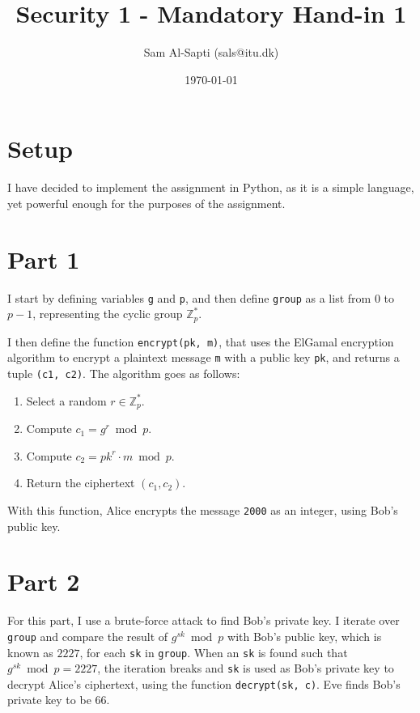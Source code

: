 \documentclass[12pt,a4paper]{article}
\title{Security 1 - Mandatory Hand-in 1}
\date{\today}
\author{Sam Al-Sapti (sals@itu.dk)}
\begin{document}
    \maketitle

    \section*{Setup}

    I have decided to implement the assignment in Python, as it is a simple
    language, yet powerful enough for the purposes of the assignment.
    
    \section*{Part 1}

    I start by defining variables \texttt{g} and \texttt{p}, and then define
    \texttt{group} as a list from $0$ to $p - 1$, representing the cyclic
    group $\mathbb{Z}^*_p$.

    I then define the function \texttt{encrypt(pk, m)}, that uses the ElGamal
    encryption algorithm to encrypt a plaintext message \texttt{m} with a
    public key \texttt{pk}, and returns a tuple \texttt{(c1, c2)}. The
    algorithm goes as follows:

    \begin{enumerate}
        \item Select a random $r \in \mathbb{Z}^*_p$.
        \item Compute $c_1 = g^r \bmod p$.
        \item Compute $c_2 = {pk}^r \cdot m \bmod p$.
        \item Return the ciphertext $(c_1, c_2)$.
    \end{enumerate}

    With this function, Alice encrypts the message \texttt{2000} as an
    integer, using Bob's public key.

    \section*{Part 2}

    For this part, I use a brute-force attack to find Bob's private key. I
    iterate over \texttt{group} and compare the result of $g^{sk} \bmod p$
    with Bob's public key, which is known as $2227$, for each \texttt{sk} in
    \texttt{group}. When an \texttt{sk} is found such that $g^{sk} \bmod p =
    2227$, the iteration breaks and \texttt{sk} is used as Bob's private key
    to decrypt Alice's ciphertext, using the function \texttt{decrypt(sk, c)}.
    Eve finds Bob's private key to be $66$.
\end{document}
